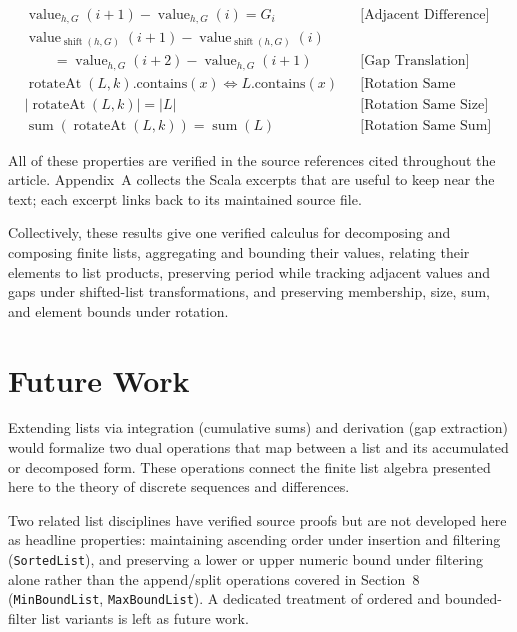 \begin{equation*}
\begin{aligned}
&\operatorname{value}_{h,G}(i + 1) - \operatorname{value}_{h,G}(i) = G_i
  &&\text{[Adjacent Difference]} \\
&\operatorname{value}_{\operatorname{shift}(h,G)}(i + 1)
  - \operatorname{value}_{\operatorname{shift}(h,G)}(i) \\
&\qquad = \operatorname{value}_{h,G}(i + 2) - \operatorname{value}_{h,G}(i + 1)
  &&\text{[Gap Translation]} \\
&\operatorname{rotateAt}(L,k).\text{contains}(x)
  \iff L.\text{contains}(x)
  &&\text{[Rotation Same Elements]} \\
&|\operatorname{rotateAt}(L,k)| = |L|
  &&\text{[Rotation Same Size]} \\
&\operatorname{sum}(\operatorname{rotateAt}(L,k)) = \operatorname{sum}(L)
  &&\text{[Rotation Same Sum]}
\end{aligned}
\end{equation*}

All of these properties are verified in the source references cited
throughout the article. Appendix~A collects the Scala excerpts that are
useful to keep near the text; each excerpt links back to its maintained
source file.

Collectively, these results give one verified calculus for decomposing
and composing finite lists, aggregating and bounding their values,
relating their elements to list products, preserving period while
tracking adjacent values and gaps under shifted-list transformations, and
preserving membership, size, sum, and element bounds under rotation.

\section{Future Work}
\label{sec:future-work}

Extending lists via integration (cumulative sums) and derivation (gap
extraction) would formalize two dual operations that map between a list
and its accumulated or decomposed form. These operations connect the
finite list algebra presented here to the theory of discrete sequences
and differences.

Two related list disciplines have verified source proofs but are not
developed here as headline properties: maintaining ascending order under
insertion and filtering (\texttt{SortedList}), and preserving a lower or
upper numeric bound under filtering alone rather than the append/split
operations covered in Section~8 (\texttt{MinBoundList},
\texttt{MaxBoundList}). A dedicated treatment of ordered and
bounded-filter list variants is left as future work.

